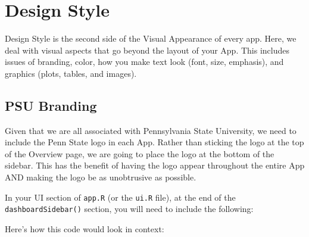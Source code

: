 \documentclass[
]{book}
\newenvironment{Shaded}{\begin{snugshade}}{\end{snugshade}}
\newcommand{\DataTypeTok}[1]{\textcolor[rgb]{0.13,0.29,0.53}{#1}}
\newcommand{\KeywordTok}[1]{\textcolor[rgb]{0.13,0.29,0.53}{\textbf{#1}}}
\newcommand{\NormalTok}[1]{#1}
\newcommand{\OperatorTok}[1]{\textcolor[rgb]{0.81,0.36,0.00}{\textbf{#1}}}
\newcommand{\StringTok}[1]{\textcolor[rgb]{0.31,0.60,0.02}{#1}}
\begin{document}
\hypertarget{designStylec}{%
\chapter{Design Style}\label{designStylec}}

Design Style is the second side of the Visual Appearance of every app. Here, we deal with visual aspects that go beyond the layout of your App. This includes issues of branding, color, how you make text look (font, size, emphasis), and graphics (plots, tables, and images).

\hypertarget{logoc}{%
\section{PSU Branding}\label{logoc}}

Given that we are all associated with Pennsylvania State University, we need to include the Penn State logo in each App. Rather than sticking the logo at the top of the Overview page, we are going to place the logo at the bottom of the sidebar. This has the benefit of having the logo appear throughout the entire App AND making the logo be as unobtrusive as possible.

In your UI section of \texttt{app.R} (or the \texttt{ui.R} file), at the end of the \texttt{dashboardSidebar()} section, you will need to include the following:

\begin{Shaded}
\end{Shaded}

Here's how this code would look in context:
\end{document}
